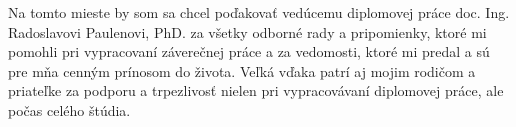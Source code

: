Na tomto mieste by som sa chcel poďakovať vedúcemu diplomovej práce doc. Ing. Radoslavovi Paulenovi, PhD. za všetky odborné rady a pripomienky, ktoré mi pomohli pri vypracovaní záverečnej práce a za vedomosti, ktoré mi predal a sú pre mňa cenným prínosom do života. Veľká vďaka patrí aj mojim rodičom a priateľke za podporu a trpezlivosť nielen pri vypracovávaní diplomovej práce, ale počas celého štúdia.